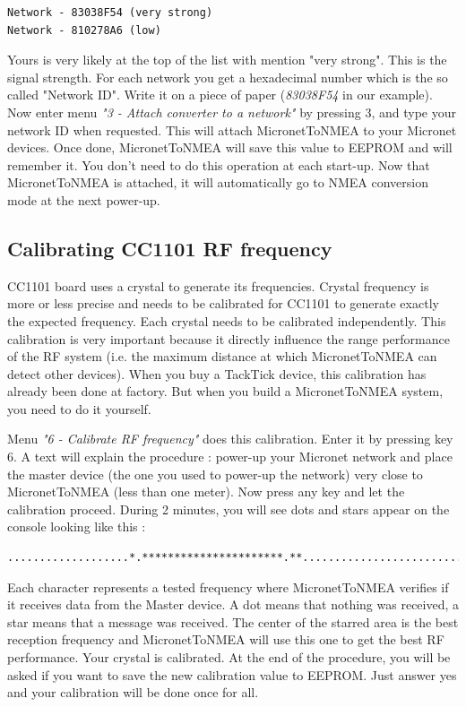 \documentclass{report}
\begin{document}
\begin{verbatim}
Network - 83038F54 (very strong)
Network - 810278A6 (low)
\end{verbatim}

Yours is very likely at the top of the list with mention "very strong". This is the signal strength. For each network you get a hexadecimal number which is the so called "Network ID". Write it on a piece of paper (\emph{83038F54} in our example).
Now enter menu \emph{"3 - Attach converter to a network"} by pressing 3, and type your network ID when requested. This will attach MicronetToNMEA to your Micronet devices.
Once done, MicronetToNMEA will save this value to EEPROM and will remember it. You don't need to do this operation at each start-up. Now that MicronetToNMEA is attached, it will automatically go to NMEA conversion mode at the next power-up.

\subsection{Calibrating CC1101 RF frequency}

CC1101 board uses a crystal to generate its frequencies. Crystal frequency is more or less precise and needs to be calibrated for CC1101 to generate exactly the expected frequency. Each crystal needs to be calibrated independently. This calibration is very important because it directly influence the range performance of the RF system (i.e. the maximum distance at which MicronetToNMEA can detect other devices). When you buy a TackTick device, this calibration has already been done at factory. But when you build a MicronetToNMEA system, you need to do it yourself.

Menu \emph{"6 - Calibrate RF frequency"} does this calibration. Enter it by pressing key 6. A text will explain the procedure : power-up your Micronet network and place the master device (the one you used to power-up the network) very close to MicronetToNMEA (less than one meter). Now press any key and let the calibration proceed. During 2 minutes, you will see dots and stars appear on the console looking like this :

\begin{verbatim}
...................*.**********************.**.....................................
\end{verbatim}

Each character represents a tested frequency where MicronetToNMEA verifies if it receives data from the Master device. A dot means that nothing was received, a star means that a message was received. The center of the starred area is the best reception frequency and MicronetToNMEA will use this one to get the best RF performance. Your crystal is calibrated.
At the end of the procedure, you will be asked if you want to save the new calibration value to EEPROM. Just answer yes and your calibration will be done once for all.
\end{document}
